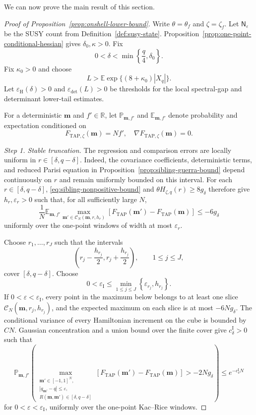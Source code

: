 \documentclass[a4paper,10pt,reqno]{amsart}
\numberwithin{equation}{section}
\newcommand{\dR}{\mathbb{R}}%
\newcommand{\ve}{\varepsilon}
\newcommand{\dP}{\mathbb{P}}%
\newcommand{\dE}{\mathbb{E}}%
\newcommand{\mc}{\mathcal}
\newcommand{\TAP}{\mathrm{TAP}}
\newcommand{\bfm}{\mathbf{m}}
\begin{document}
	We can now prove the main result of this section.
	
	\begin{proof}[Proof of Proposition~\ref{prop:onshell-lower-bound}]
		Write \(\theta=\theta_f\) and \(\zeta=\zeta_f\).
		Let \(\mathsf N_\ve\) be the SUSY count from
		Definition~\ref{def:susy-state}.
		Proposition~\ref{prop:one-point-conditional-hessian} gives
		\(\delta_0,\kappa>0\). Fix
		\[
		0<\delta<\min\left\{\frac q4,\delta_0\right\}.
		\]
		Fix \(\kappa_0>0\) and choose
		\[
		L>
		\dE\exp\{(8+\kappa_0)|X_q|\}.
		\]
		Let \(\ve_{\mathrm H}(\delta)>0\) and
		\(\ve_{\det}(L)>0\) be thresholds for the
		local spectral-gap and determinant lower-tail estimates.
		
		For a deterministic \(\bfm\) and \(f'\in\dR\), let
		\(\dP_{\bfm,f'}\) and \(\dE_{\bfm,f'}\) denote probability and
		expectation conditioned on
		\[
		F_{\TAP,\zeta}(\bfm)=Nf',\quad
		\nabla F_{\TAP,\zeta}(\bfm)=0.
		\]
		
		\medskip\noindent\emph{Step 1. Stable truncation.}
		The regression and comparison errors are locally uniform in
		\(r\in[\delta,q-\delta]\). Indeed, the covariance coefficients,
		deterministic terms, and reduced Parisi equation in
		Proposition~\ref{prop:sibling-guerra-bound} depend continuously on \(r\)
		and remain uniformly bounded on this interval.
		For each \(r\in[\delta,q-\delta]\),
		\eqref{eq:sibling-nonpositive-bound} and
		\(\theta H_{\zeta,q}(r)\ge8g_\delta\) therefore give
		\(h_r,\ve_r>0\) such that, for all sufficiently large \(N\),
		\[
		\frac1N\dE_{\bfm,f'}
		\max_{\bfm'\in\mc C_N(\bfm,r,h_r)}
		\left[
		F_{\TAP}(\bfm')-F_{\TAP}(\bfm)
		\right]
		\le-6g_\delta
		\]
		uniformly over the one-point windows of width at most
		\(\ve_r\).
		
		Choose \(r_1,\ldots,r_J\) such that the intervals
		\[
		\left(r_j-\frac{h_{r_j}}2,r_j+\frac{h_{r_j}}2\right),
		\qquad 1\le j\le J,
		\]
		cover \([\delta,q-\delta]\). Choose
		\[
		0<\ve_{\mathrm I}
		\le
		\min_{1\le j\le J}
		\left\{\ve_{r_j},h_{r_j}\right\}.
		\]
		If \(0<\ve<\ve_{\mathrm I}\), every point in the maximum
		below belongs to at least one slice
		\(\mc C_N(\bfm,r_j,h_{r_j})\), and the expected maximum on each slice is at
		most \(-6Ng_\delta\). The conditional variance of every Hamiltonian
		increment on the cube is bounded by \(CN\). Gaussian concentration and
		a union bound over the finite cover give \(c_\delta^{\mathrm I}>0\) such
		that
		\begin{equation}\label{eq:sibling-uniform-intermediate}
			\dP_{\bfm,f'}\left(
			\max_{\substack{
					\bfm'\in[-1,1]^N,\\
					|q_{\bfm'}-q|\le\ve,\\
					R(\bfm,\bfm')\in[\delta,q-\delta]
			}}
			\left[F_{\TAP}(\bfm')-F_{\TAP}(\bfm)\right]
			>-2Ng_\delta
			\right)
			\le e^{-c_\delta^{\mathrm I}N}
		\end{equation}
		for \(0<\ve<\ve_{\mathrm I}\), uniformly over the
		one-point Kac--Rice windows.
		

\end{proof}
\end{document}
